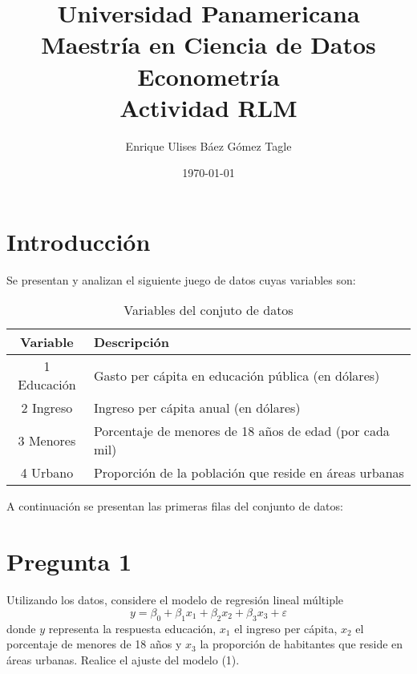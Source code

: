 \documentclass[10pt]{article}
\title{Universidad Panamericana \\ Maestría en Ciencia de Datos \\ Econometría \\ \vspace{0.5cm} Actividad RLM}
\author{Enrique Ulises Báez Gómez Tagle}
\date{\today}
\begin{document}
\maketitle
\tableofcontents
\newpage
\section{Introducción}
Se presentan y analizan el siguiente juego de datos cuyas variables son:
\begin{table}[H]
    \centering
    \begin{tabular}{|c|l|}
        \hline
        \textbf{Variable} & \textbf{Descripción} \\
        \hline
        1 Educación & Gasto per cápita en educación pública (en dólares) \\
        \hline
        2 Ingreso & Ingreso per cápita anual (en dólares) \\
        \hline
        3 Menores & Porcentaje de menores de 18 años de edad (por cada mil) \\
        \hline
        4 Urbano & Proporción de la población que reside en áreas urbanas \\
        \hline
    \end{tabular}
    \caption{Variables del conjuto de datos}
\end{table}
A continuación se presentan las primeras filas del conjunto de datos:

\section{Pregunta 1}
Utilizando los datos, considere el modelo de regresión lineal múltiple 
\[
y = \beta_0 + \beta_1 x_1 + \beta_2 x_2 + \beta_3 x_3 + \varepsilon
\]
donde $y$ representa la respuesta educación, $x_1$ el ingreso per cápita, $x_2$ el porcentaje de menores de 18 años y $x_3$ la proporción de habitantes que reside en áreas urbanas. 
Realice el ajuste del modelo (1). \\
\end{document}

